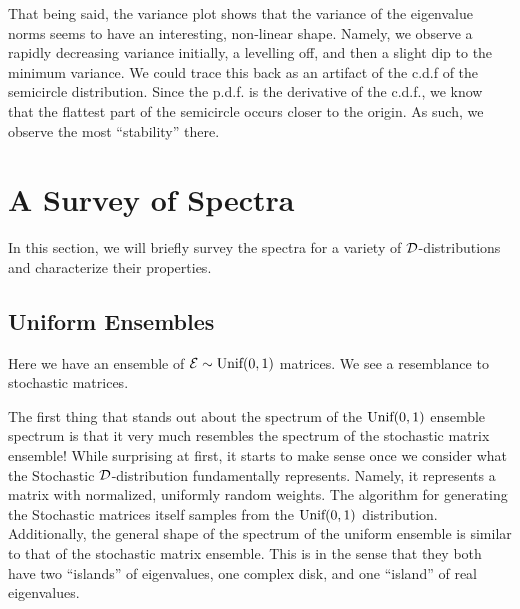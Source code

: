 That being said, the variance plot shows that the variance of the eigenvalue norms seems to have an interesting, non-linear shape. Namely, we observe a rapidly decreasing variance initially, a levelling off, and then a slight dip to the minimum variance. We could trace this back as an artifact of the c.d.f of the semicircle distribution. Since the p.d.f. is the derivative of the c.d.f., we know that the flattest part of the semicircle occurs closer to the origin. As such, we observe the most ``stability'' there.

\trim
{}%

\newpage
\section{A Survey of Spectra}

In this section, we will briefly survey the spectra for a variety of $\mathcal{D}$-distributions and characterize their properties.

\subsection{Uniform Ensembles}
Here we have an ensemble of $\mathcal{E} \sim \text{Unif}(0,1)$ matrices. We see a resemblance to
stochastic matrices.

\vspace{-1em}
\vspace{-2em}

The first thing that stands out about the spectrum of the $\text{Unif}(0,1)$ ensemble spectrum is that it very much resembles the spectrum of the stochastic matrix ensemble!
While surprising at first, it starts to make sense once we consider what the Stochastic $\mathcal{D}$-distribution fundamentally represents. Namely, it represents a matrix with normalized, uniformly random weights. The algorithm for generating the Stochastic matrices itself samples from the $\text{Unif}(0,1)$ distribution. Additionally, the general shape of the spectrum of the uniform ensemble is similar to that of the stochastic matrix ensemble. This is in the sense that they both have two ``islands'' of eigenvalues, one complex disk, and one ``island'' of real eigenvalues. \newline

